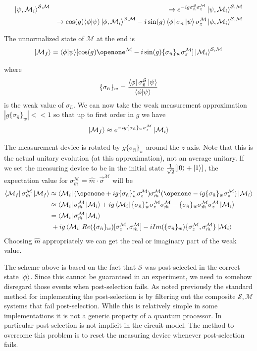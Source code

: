 \documentclass[aps,pra,12pt,onecolumn,showpacs,superscriptaddress,floatfix,footinbib,subfigure]{revtex4}
\def\bra#1{\mathinner{\langle{#1}|}}
\def\ket#1{\mathinner{|{#1}\rangle}}
\def\es{{\mathcal{S}}}
\def\md{{\mathcal{M}}}
\def\sm{{\es,\md}}
\def\sn{ \sigma_{ \hat{n} } }
\begin{document}
\begin{eqnarray}
\ket{\psi,\md_i}^\sm&&\rightarrow e^{-ig\sn^\es\sigma_z^\md}\ket{\psi,\md_i}^\sm  \nonumber\\
&&\rightarrow \cos(g)\langle {\phi}|{\psi}\rangle \ket{\phi,\md_i}^\sm-i\sin(g)\bra{\phi}\sn\ket{\psi}\sigma_z^\md\ket{\phi,\md_i}^\sm
\end{eqnarray}

The unnormalized state of $\md$ at the end is
\begin{equation}
\ket{\md_f}=\langle {\phi}|{\psi}\rangle[ \cos(g)\openone^\md-i\sin(g)\{\sn\}_w\sigma_z^\md]\ket{\md_i}^\sm
\end{equation}

where
\begin{equation}
\label{weakvalue}
\{\sn\}_w=\frac{\bra{\phi}\sn^\es\ket{\psi}}{\langle {\phi}|{\psi}\rangle}
\end{equation}
is  the weak value of $\sn$. We can now take the weak measurement approximation $|g\{\sn\}_w|<<1$ so that up to first order in $g$ we have
\begin{equation}
\ket{\md_f}\approx e^{-ig\{\sn\}_w\sigma_z^\md}\ket{\md_i}
\end{equation}

The measurement device is rotated by $g\{\sigma_{\hat{n}}\}_w$ around the $z$-axis.  Note that this is the actual unitary evolution (at this approximation), not an average unitary.  If we set the measuring device to be in the initial state $\frac{1}{\sqrt{2}}[\ket{0}+\ket{1}]$,  the  expectation value for $\sigma_{\hat{m}}^\md=\hat{m}\cdot\vec{\sigma}^\md$ will be
\begin{align}\label{readout}
\bra{\md_f}\sigma_{\hat{m}}^\md\ket{\md_f}&\approx\bra{\md_i}(\openone+ig\{\sn\}_w^*\sigma_z^\md)\sigma_{\hat{m}}^\md(\openone-ig\{\sn\}_w\sigma_z^\md)\ket{\md_i}\\&\approx\bra{\md_i}\sigma_{\hat{m}}^\md\ket{\md_i}+ig\bra{\md_i}\{\sn\}_w^*\sigma_z^\md\sigma_{\hat{m}}^\md-\{\sn\}_w\sigma_{\hat{m}}^\md\sigma_z^\md\ket{\md_i}\\
\label{ReIm}&=\bra{\md_i}\sigma_{\hat{m}}^\md\ket{\md_i}\\&\;+ig\bra{\md_i}Re(\{\sn\}_w)[\sigma_z^\md,\sigma_{\hat{m}}^\md]-iIm(\{\sn\}_w)\{\sigma_z^\md,\sigma_{\hat{m}}^\md\}\ket{\md_i}\nonumber
\end{align}
Choosing $\hat{m}$ appropriately we can get  the real or imaginary part of the weak value.

The scheme above is based on the fact that $\es$ was post-selected in the correct state $\ket{\phi}$. Since this cannot be guaranteed in an experiment, we need to somehow disregard those events when post-selection fails.  As noted previously the standard method for implementing the post-selection is by filtering out the composite $\sm$ systems that fail post-selection. While this is relatively simple in some  implementations  it  is not a generic property of a quantum processor. In particular post-selection is not implicit in the circuit model. The method to overcome this problem  is to reset the measuring device whenever post-selection fails.
\end{document}
